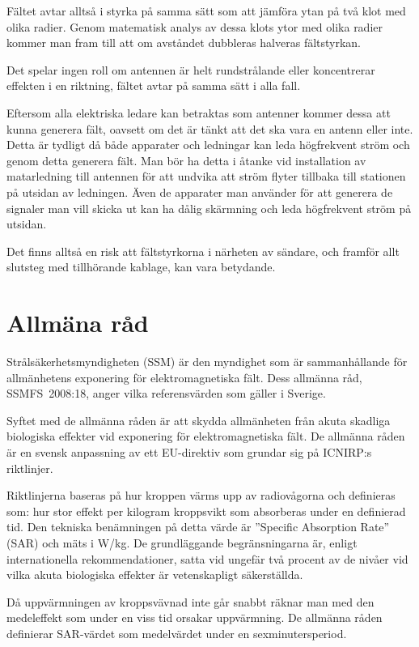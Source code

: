 Fältet avtar alltså i styrka på samma sätt som att jämföra ytan på två
klot med olika radier.
Genom matematisk analys av dessa klots ytor med olika radier kommer man fram
till att om avståndet dubbleras halveras fältstyrkan.

Det spelar ingen roll om antennen är helt rundstrålande eller koncentrerar
effekten i en riktning, fältet avtar på samma sätt i alla fall.

Eftersom alla elektriska ledare kan betraktas som antenner kommer dessa att
kunna generera fält, oavsett om det är tänkt att det ska vara en antenn eller
inte.
Detta är tydligt då både apparater och ledningar kan leda högfrekvent ström och
genom detta generera fält.
Man bör ha detta i åtanke vid installation av matarledning till antennen för
att undvika att ström flyter tillbaka till stationen på utsidan av ledningen.
Även de apparater man använder för att generera de signaler man vill skicka ut
kan ha dålig skärmning och leda högfrekvent ström på utsidan.

Det finns alltså en risk att fältstyrkorna i närheten av sändare, och
framför allt slutsteg med tillhörande kablage, kan vara betydande.

\section{Allmäna råd}

Strålsäkerhetsmyndigheten (SSM) är den myndighet som är sammanhållande
för allmänhetens exponering för elektromagnetiska fält.
Dess allmänna råd, SSMFS~2008:18, anger vilka referensvärden som gäller i
Sverige.

Syftet med de allmänna råden är att skydda allmänheten från akuta
skadliga biologiska effekter vid exponering för elektromagnetiska fält.
De allmänna råden är en svensk anpassning av ett EU-direktiv som
grundar sig på ICNIRP:s riktlinjer.

Riktlinjerna baseras på hur kroppen värms upp av radiovågorna och definieras
som: hur stor effekt per kilogram kroppsvikt som absorberas under en definierad
tid.
Den tekniska benämningen på detta värde är ''Specific Absorption Rate'' (SAR)
och mäts i W/kg.
De grundläggande begränsningarna är, enligt internationella rekommendationer,
satta vid ungefär två procent av de nivåer vid vilka akuta biologiska effekter
är vetenskapligt säkerställda.

Då uppvärmningen av kroppsvävnad inte går snabbt räknar man med den
medeleffekt som under en viss tid orsakar uppvärmning.
De allmänna råden definierar SAR-värdet som medelvärdet under en
sexminutersperiod.

